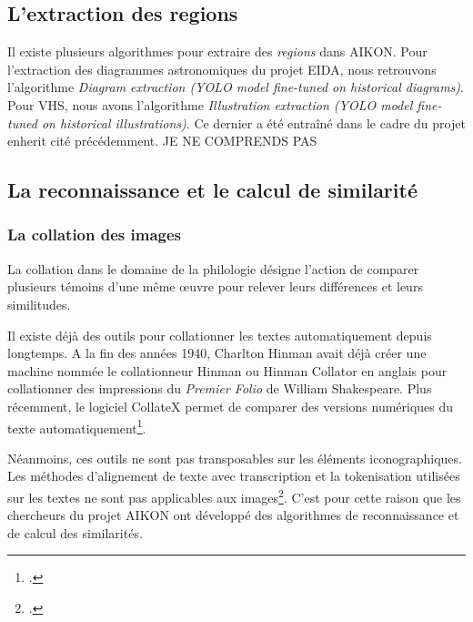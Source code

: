 \subsection{L'extraction des regions}

Il existe plusieurs algorithmes pour extraire des \textit{regions}  dans AIKON. 
Pour l'extraction des diagrammes astronomiques du projet EIDA, nous retrouvons l'algorithme \textit{Diagram extraction (YOLO model fine-tuned on historical diagrams)}.
Pour VHS, nous avons l'algorithme \textit{Illustration extraction (YOLO model fine-tuned on historical illustrations)}. Ce dernier a été entraîné dans le cadre du projet \gls{enherit} cité précédemment. JE NE COMPRENDS PAS


\subsection{La reconnaissance et le calcul de similarité}

\subsubsection{La collation des images}

La collation dans le domaine de la philologie désigne l'action de comparer plusieurs témoins d'une même œuvre pour relever leurs différences et leurs similitudes. 

Il existe déjà des outils pour collationner les textes automatiquement depuis longtemps. A la fin des années 1940, Charlton Hinman avait déjà créer une machine nommée le collationneur Hinman ou Hinman Collator en anglais pour collationner des impressions du \textit{Premier Folio} de William Shakespeare. Plus récemment, le logiciel CollateX permet de comparer des versions numériques du texte automatiquement\footcite{kaouaImageCollationMatching2021}. 

Néanmoins, ces outils ne sont pas transposables sur les éléments iconographiques. Les méthodes d'alignement de texte avec transcription et la tokenisation  utilisées sur les textes ne sont pas applicables aux images\footcite{kaouaImageCollationMatching2021}. C'est pour cette raison que les chercheurs du projet AIKON ont développé des algorithmes de reconnaissance et de calcul des similarités.

